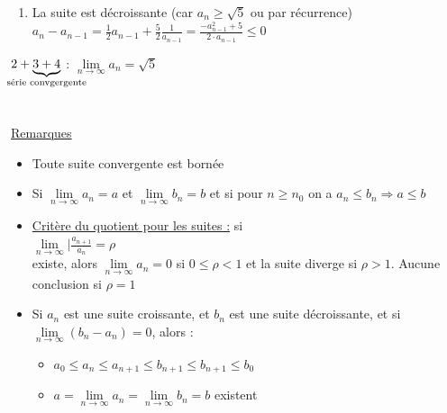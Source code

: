 \documentclass[12pt,a4paper]{article}
\newcommand{\limite}{\lim\limits_}
\newcommand{\ninf}{\ensuremath{n \to \infty}}
\begin{document}
{\begin{enumerate}
\begin{itemize}
\item $a_1 = 3 \geq \sqrt{5}$
\item $a_n = \frac{1}{2}(a_{n-1} + \frac{5}{<_{n-1}} = \frac{1}{2a_{n_1}}(a_{n-1}^2 + 5) = \frac{1}{2a_{n-1}}(a_{n-1} - \sqrt{5})^2 + \sqrt{5} \geq \sqrt{5} (P_n)$
\end{itemize}
\item La suite est décroissante (car $a_n \geq \sqrt{5}$ ou par récurrence)\\
$a_n - a_{n-1} = \frac{1}{2}a_{n-1} + \frac{5}{2} \frac{1}{a_{n-1}} = \frac{-a_{n-1}^2 + 5}{2\cdot a_{n-1}} \leq 0$\\
\end{enumerate}
$2+\underbrace{3+4}_{\mathclap{\text{série convgergente}}}$ : $\limite{\ninf} a_n = \sqrt{5}$ \\
\\
\\
\underline{Remarques}
\begin{itemize}
\item Toute suite convergente est bornée
\item Si $\limite{\ninf} a_n = a$ et $\limite{\ninf} b_n = b$ et si pour $n \geq n_0$ on a $a_n \leq b_n \Rightarrow a \leq b$
\item \underline{Critère du quotient pour les suites :} si\\
 $\limite{\ninf}|\frac{a_{n+1}}{a_n} = \rho$\\
 existe, alors $\limite{\ninf} a_n = 0$ si $0 \leq \rho < 1$ et la suite diverge si $\rho > 1$. Aucune conclusion si $\rho = 1$
 \item Si $a_n$ est une suite croissante, et $b_n$ est une suite décroissante, et si $\limite{\ninf}(b_n-a_n) = 0$, alors :
 \begin{itemize}
 \item $a_0 \leq a_n \leq a_{n+1} \leq b_{n+1} \leq b_{n+1}\leq b_0$
 \item $a = \limite{\ninf} a_n = \limite{\ninf} b_n = b$ existent
 \end{itemize}
\end{itemize}

}
\end{document}
